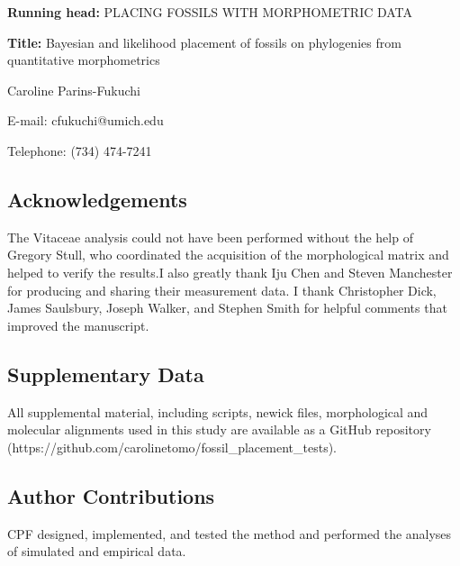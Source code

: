 \documentclass[12pt]{article}
\begin{document}
\setcounter{page}{1}

\noindent \textbf{Running head:} PLACING FOSSILS WITH MORPHOMETRIC DATA

\noindent \textbf{Title:} Bayesian and likelihood placement of fossils on phylogenies from quantitative morphometrics

\noindent Caroline Parins-Fukuchi


\noindent E-mail: cfukuchi@umich.edu

\noindent Telephone: (734) 474-7241

\medskip


\newpage


\subsection*{Acknowledgements}
The Vitaceae analysis could not have been performed without the help of Gregory Stull, who coordinated the acquisition of the morphological matrix and helped to verify the results.I also greatly thank Iju Chen and Steven Manchester for producing and sharing their measurement data.  I  thank Christopher Dick, James Saulsbury, Joseph Walker, and Stephen Smith for helpful comments that improved the manuscript. 

\subsection*{Supplementary Data}
All supplemental material, including scripts, newick files, morphological and molecular alignments used in this study are available as a GitHub repository (https://github.com/carolinetomo/fossil\_placement\_tests).

\subsection*{Author Contributions}
CPF designed, implemented, and tested the method and performed the analyses of simulated and empirical data.
\end{document}
